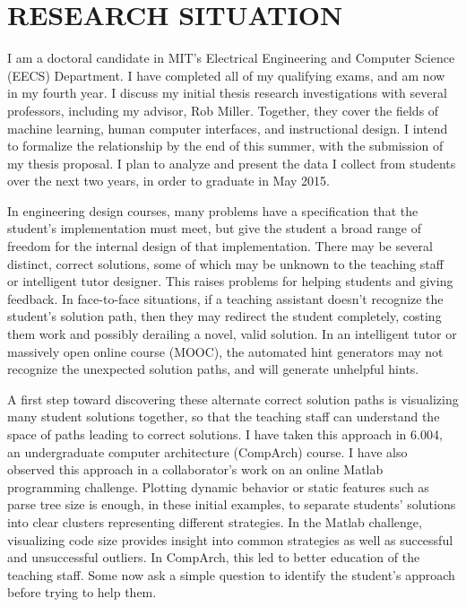 \documentclass{sig-alternate-2013}
\begin{document}
\section{RESEARCH SITUATION}

I am a doctoral candidate in MIT's Electrical Engineering and Computer Science (EECS) Department. I have completed all of my qualifying exams, and am now in my fourth year. I discuss my initial thesis research investigations with several professors, including my advisor, Rob Miller. Together, they cover the fields of machine learning, human computer interfaces, and instructional design. I intend to formalize the relationship by the end of this summer, with the submission of my thesis proposal. I plan to analyze and present the data I collect from students over the next two years, in order to graduate in May 2015.

In engineering design courses, many problems have a specification that the student's implementation must meet, but give the student a broad range of freedom for the internal design of that implementation. There may be several distinct, correct solutions, some of which may be unknown to the teaching staff or intelligent tutor designer. This raises problems for helping students and giving feedback. In face-to-face situations, if a teaching assistant doesn't recognize the student's solution path, then they may redirect the student completely, costing them work and possibly derailing a novel, valid solution.  In an intelligent tutor or massively open online course (MOOC), the automated hint generators may not recognize the unexpected solution paths, and will generate unhelpful hints.

A first step toward discovering these alternate correct solution paths is visualizing many student solutions together, so that the teaching staff can understand the space of paths leading to correct solutions. I have taken this approach in 6.004, an undergraduate computer architecture (CompArch) course. I have also observed this approach in a collaborator's work on an online Matlab programming challenge. Plotting dynamic behavior or static features such as parse tree size is enough, in these initial examples, to separate students' solutions into clear clusters representing different strategies. In the Matlab challenge, visualizing code size provides insight into common strategies as well as successful and unsuccessful outliers. In CompArch, this led to better education of the teaching staff. Some now ask a simple question to identify the student's approach before trying to help them.
\end{document}
